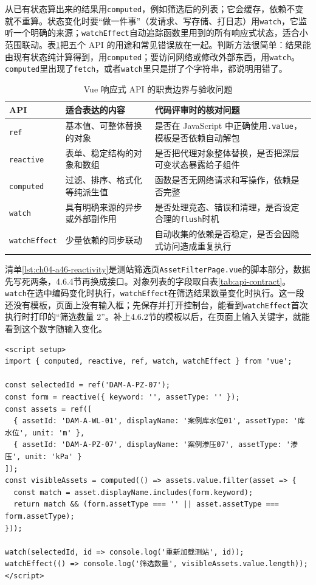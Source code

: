 从已有状态算出来的结果用\texttt{computed}，例如筛选后的列表；它会缓存，依赖不变就不重算。状态变化时要“做一件事”（发请求、写存储、打日志）用\texttt{watch}，它监听一个明确的来源；\texttt{watchEffect}自动追踪函数里用到的所有响应式状态，适合小范围联动。表\ref{tab:ch04-a46-reactivity-choice}把五个 API 的用途和常见错误放在一起。判断方法很简单：结果能由现有状态纯计算得到，用\texttt{computed}；要访问网络或修改外部东西，用\texttt{watch}。\texttt{computed}里出现了\texttt{fetch}，或者\texttt{watch}里只是拼了个字符串，都说明用错了。

\begin{table}[H]
\centering
\caption{Vue 响应式 API 的职责边界与验收问题}
\label{tab:ch04-a46-reactivity-choice}
\begin{tabular}{p{2.3cm}p{3.5cm}p{4.8cm}}
\toprule
API & 适合表达的内容 & 代码评审时的核对问题 \\
\midrule
\texttt{ref} & 基本值、可整体替换的对象 & 是否在 JavaScript 中正确使用\texttt{.value}，模板是否依赖自动解包 \\
\texttt{reactive} & 表单、稳定结构的对象和数组 & 是否把代理对象整体替换，是否把深层可变状态暴露给子组件 \\
\texttt{computed} & 过滤、排序、格式化等纯派生值 & 函数是否无网络请求和写操作，依赖是否完整 \\
\texttt{watch} & 具有明确来源的异步或外部副作用 & 是否处理竞态、错误和清理，是否设定合理的\texttt{flush}时机 \\
\texttt{watchEffect} & 少量依赖的同步联动 & 自动收集的依赖是否稳定，是否会因隐式访问造成重复执行 \\
\bottomrule
\end{tabular}
\end{table}

清单\ref{lst:ch04-a46-reactivity}是测站筛选页\texttt{AssetFilterPage.vue}的脚本部分，数据先写死两条，4.6.4节再换成接口。对象列表的字段取自表\ref{tab:api-contract}。\texttt{watch}在选中编码变化时执行，\texttt{watchEffect}在筛选结果数量变化时执行。这一段还没有模板，页面上没有输入框；先保存并打开控制台，能看到\texttt{watchEffect}首次执行时打印的“筛选数量 2”。补上4.6.2节的模板以后，在页面上输入关键字，就能看到这个数字随输入变化。

\begin{lstlisting}[label={lst:ch04-a46-reactivity},language=Vue,caption={AssetFilterPage.vue 的脚本：响应式状态、计算属性与监听器}]
<script setup>
import { computed, reactive, ref, watch, watchEffect } from 'vue';

const selectedId = ref('DAM-A-PZ-07');
const form = reactive({ keyword: '', assetType: '' });
const assets = ref([
  { assetId: 'DAM-A-WL-01', displayName: '案例库水位01', assetType: '库水位', unit: 'm' },
  { assetId: 'DAM-A-PZ-07', displayName: '案例渗压07', assetType: '渗压', unit: 'kPa' }
]);
const visibleAssets = computed(() => assets.value.filter(asset => {
  const match = asset.displayName.includes(form.keyword);
  return match && (form.assetType === '' || asset.assetType === form.assetType);
}));

watch(selectedId, id => console.log('重新加载测站', id));
watchEffect(() => console.log('筛选数量', visibleAssets.value.length));
</script>
\end{lstlisting}


